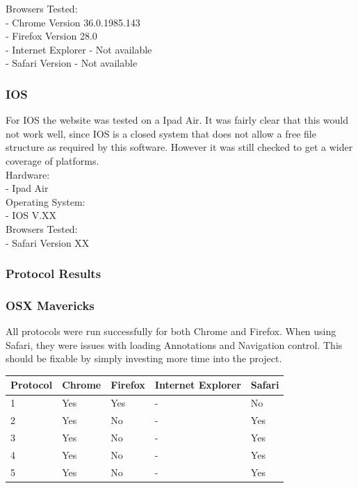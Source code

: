 \documentclass[a4paper,11pt,titlepage]{article}
\begin{document}
\noindent Browsers Tested:\\
- Chrome Version 36.0.1985.143\\
- Firefox Version 28.0\\
- Internet Explorer - Not available\\
- Safari Version - Not available


\subsubsection*{IOS}

For IOS the website was tested on a Ipad Air. It was fairly clear that this would not work well, since IOS is a closed system that does not allow a free file structure as required by this software. However it was still checked to get a wider coverage of platforms.\\

\noindent Hardware:\\
- Ipad Air\\

\noindent Operating System:\\
- IOS V.XX\\

\noindent Browsers Tested:\\
- Safari Version XX



\subsubsection{Protocol Results}

\subsubsection*{OSX Mavericks}

All protocols were run successfully for both Chrome and Firefox. When using Safari, they were issues with loading Annotations and Navigation control. This should be fixable by simply investing more time into the project.\\


\begin{center}
  \begin{tabular}{ | l || l | l | l | l |}
    \hline
    Protocol & Chrome & Firefox & Internet Explorer & Safari \\ \hline \hline
    1 & Yes & Yes  & - & No   \\ \hline
    2 & Yes & No & - & Yes \\ \hline
    3 & Yes & No & - & Yes  \\ \hline
    4 & Yes & No & - & Yes  \\ \hline
    5 & Yes & No & - & Yes  \\
    \hline
  \end{tabular}
\end{center}
\end{document}
